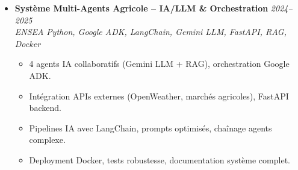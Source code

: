 \documentclass[a4paper,11pt]{article}
\begin{document}
\begin{itemize}[leftmargin=*, label={-}]
    \textit{1\textsuperscript{er} Prix CITS National (vs 75 \'equipes)} \hfill \textit{Python, scikit-learn, XGBoost, Isolation Forest, pandas}
    \vspace{-2pt}
        \begin{itemize}[leftmargin=0.4cm, nosep, label=\tiny$\bullet$]
            \item \small{Architecture IoT : capteurs, LPWAN, backend centralisé avec données massives.}
            \item \small{Modèle ML (scikit-learn, XGBoost) prédiction remplissage conteneurs temps réel.}
            \item \small{Détection anomalies (isolation forest), alertes automatiques, -20\% coûts transport.}
            \item \small{Pipeline ETL complet, dashboards temps réel, 1er prix national vs 75 équipes.}
        \end{itemize}
    \vspace{3pt}
    \item \textbf{Syst\`eme Multi-Agents Agricole -- IA/LLM \& Orchestration} \hfill \textit{2024--2025} \\
    \textit{ENSEA} \hfill \textit{Python, Google ADK, LangChain, Gemini LLM, FastAPI, RAG, Docker}
    \vspace{-2pt}
        \begin{itemize}[leftmargin=0.4cm, nosep, label=\tiny$\bullet$]
            \item \small{4 agents IA collaboratifs (Gemini LLM + RAG), orchestration Google ADK.}
            \item \small{Intégration APIs externes (OpenWeather, marchés agricoles), FastAPI backend.}
            \item \small{Pipelines IA avec LangChain, prompts optimisés, chaînage agents complexe.}
            \item \small{Deployment Docker, tests robustesse, documentation système complet.}
        \end{itemize}
\end{itemize}
\end{document}
